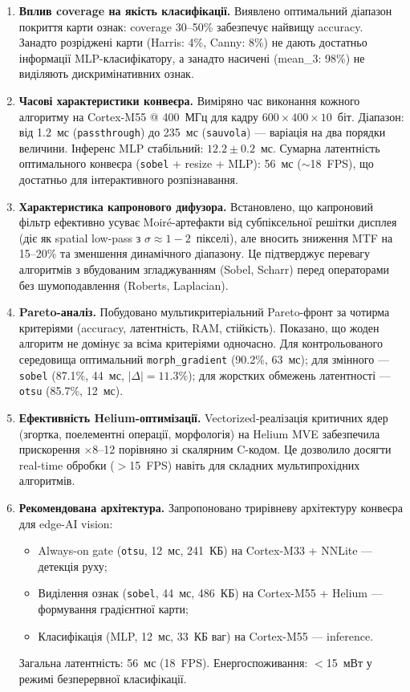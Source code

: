 \documentclass[a4paper,12pt]{article}
\begin{document}
\begin{enumerate}
	\item \textbf{Вплив coverage на якість класифікації.} Виявлено оптимальний діапазон покриття карти ознак: coverage 30--50\% забезпечує найвищу accuracy. Занадто розріджені карти (Harris: 4\%, Canny: 8\%) не дають достатньо інформації MLP-класифікатору, а занадто насичені (mean\_3: 98\%) не виділяють дискримінативних ознак.

	\item \textbf{Часові характеристики конвеєра.} Виміряно час виконання кожного алгоритму на Cortex-M55 @ 400~МГц для кадру $600\times400\times10$~біт. Діапазон: від 1.2~мс (\texttt{passthrough}) до 235~мс (\texttt{sauvola}) --- варіація на два порядки величини. Інференс MLP стабільний: $12.2 \pm 0.2$~мс. Сумарна латентність оптимального конвеєра (\texttt{sobel} + resize + MLP): 56~мс ($\sim$18~FPS), що достатньо для інтерактивного розпізнавання.

	\item \textbf{Характеристика капронового дифузора.} Встановлено, що капроновий фільтр ефективно усуває Moiré-артефакти від субпіксельної решітки дисплея (діє як spatial low-pass з $\sigma \approx 1{-}2$~пікселі), але вносить зниження MTF на 15--20\% та зменшення динамічного діапазону. Це підтверджує перевагу алгоритмів з вбудованим згладжуванням (Sobel, Scharr) перед операторами без шумоподавлення (Roberts, Laplacian).

	\item \textbf{Pareto-аналіз.} Побудовано мультикритеріальний Pareto-фронт за чотирма критеріями (accuracy, латентність, RAM, стійкість). Показано, що жоден алгоритм не домінує за всіма критеріями одночасно. Для контрольованого середовища оптимальний \texttt{morph\_gradient} (90.2\%, 63~мс); для змінного --- \texttt{sobel} (87.1\%, 44~мс, $|\Delta|=11.3\%$); для жорстких обмежень латентності --- \texttt{otsu} (85.7\%, 12~мс).

	\item \textbf{Ефективність Helium-оптимізації.} Vectorized-реалізація критичних ядер (згортка, поелементні операції, морфологія) на Helium MVE забезпечила прискорення $\times$8--12 порівняно зі скалярним C-кодом. Це дозволило досягти real-time обробки ($>$15~FPS) навіть для складних мультипрохідних алгоритмів.

	\item \textbf{Рекомендована архітектура.} Запропоновано трирівневу архітектуру конвеєра для edge-AI vision:
	\begin{itemize}
		\item Always-on gate (\texttt{otsu}, 12~мс, 241~КБ) на Cortex-M33 + NNLite --- детекція руху;
		\item Виділення ознак (\texttt{sobel}, 44~мс, 486~КБ) на Cortex-M55 + Helium --- формування градієнтної карти;
		\item Класифікація (MLP, 12~мс, 33~КБ ваг) на Cortex-M55 --- inference.
	\end{itemize}
	Загальна латентність: 56~мс (18~FPS). Енергоспоживання: $<$15~мВт у режимі безперервної класифікації.


\end{enumerate}
\end{document}
